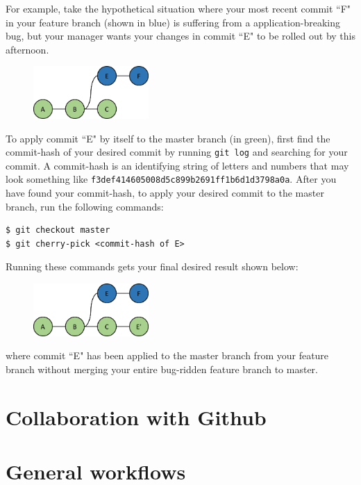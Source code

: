 \documentclass{amsart}
\begin{document}
For example, take the hypothetical situation where your most recent commit ``F" in your feature branch (shown in blue) is suffering from a application-breaking bug, but your manager wants your changes in commit ``E" to be rolled out by this afternoon.

\begin{figure}[h]
\center
\includegraphics[height=2cm]{feature}
\end{figure}

To apply commit ``E" by itself to the master branch (in green), first find the commit-hash of your desired commit by running \texttt{git log} and searching for your commit.  A commit-hash is an identifying string of letters and numbers that may look something like \texttt{f3def414605008d5c899b2691ff1b6d1d3798a0a}.  After you have found your commit-hash, to apply your desired commit to the master branch, run the following commands:
\begin{verbatim}
$ git checkout master
$ git cherry-pick <commit-hash of E>
\end{verbatim}

Running these commands gets your final desired result shown below:

\begin{figure}[h]
\center
\includegraphics[height=2cm]{cherrypick}
\end{figure}

where commit ``E" has been applied to the master branch from your feature branch without merging your entire bug-ridden feature branch to master.

\newpage
\section*{Collaboration with Github}

\section*{General workflows}
\end{document}
